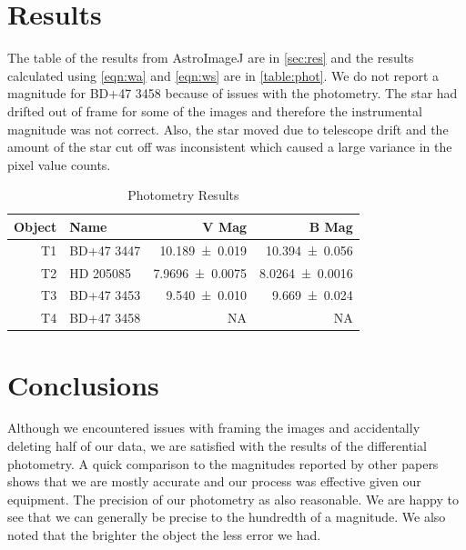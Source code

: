 \documentclass[%
aip,
jmp,
reprint,
floatfix
]{revtex4-1}
\begin{document}

	\section{Results}

	The table of the results from AstroImageJ are in \autoref{sec:res} and the results calculated using \autoref{eqn:wa} and \autoref{eqn:ws} are in \autoref{table:phot}. We do not report a magnitude for BD+47 3458 because of issues with the photometry. The star had drifted out of frame for some of the images and therefore the instrumental magnitude was not correct. Also, the star moved due to telescope drift and the amount of the star cut off was inconsistent which caused a large variance in the pixel value counts. 

	\begin{table}[ht]
		\centering
		\caption{Photometry Results}
		\begin{tabular*}{0.9\linewidth}{@{\extracolsep{\fill}}rlrr}
			\hline
			Object & Name       &                  V Mag &                  B Mag \\ \hline\hline
			    T1 & BD+47 3447 &  \SI{10.189\pm0.019}{} &  \SI{10.394\pm0.056}{} \\
			    T2 & HD 205085  & \SI{7.9696\pm0.0075}{} & \SI{8.0264\pm0.0016}{} \\
			    T3 & BD+47 3453 &    \SI{9.540\pm.010}{} &   \SI{9.669\pm0.024}{} \\
			    T4 & BD+47 3458 &                     NA &                     NA \\ \hline
		\end{tabular*}
		\label{table:phot}
	\end{table}


	\section{Conclusions}
	
	Although we encountered issues with framing the images and accidentally deleting half of our data, we are satisfied with the results of the differential photometry. A quick comparison to the magnitudes reported by other papers shows that we are mostly accurate and our process was effective given our equipment. The precision of our photometry as also reasonable. We are happy to see that we can generally be precise to the hundredth of a magnitude. We also noted that the brighter the object the less error we had.
\end{document}
